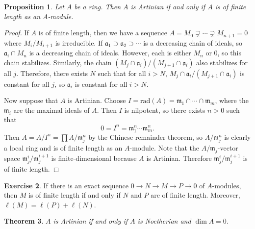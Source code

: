 \documentclass[leqno, openany]{memoir}
\newtheorem{thm}{Theorem}[section]
\newtheorem{prop}[thm]{Proposition}
\theoremstyle{definition}
\newtheorem{exer}[thm]{Exercise}
\theoremstyle{remark}
\theoremstyle{plain}
\theoremstyle{definition}
\theoremstyle{remark}
\newcommand{\mf}[1]{\mathfrak{#1}}
\newcommand{\mr}[1]{\mathrm{#1}}
\begin{document}
\begin{prop} Let $A$ be a ring. Then $A$ is Artinian if and only if $A$ is of
finite length as an $A$-module.  \end{prop}

\begin{proof} If $A$ is of finite length, then we have a sequence $A = M_0
    \supsetneq \cdots \supsetneq M_{n+1} = 0$ where $M_i / M_{i+1}$ is
    irreducible. If $\mf{a}_1 \supset \mf{a}_2 \supset \cdots$ is a decreasing
    chain of ideals, so $\mf{a}_i \cap M_n$ is a decreasing chain of ideals.
    However, each is either $M_n$ or $0$, so this chain stabilizes. Similarly,
    the chain $(M_j \cap \mf{a}_i) / (M_{j+1} \cap \mf{a}_i)$ also stabilizes
    for all $j$. Therefore, there exists $N$ such that for all $i > N$, $M_j
    \cap \mf{a}_i / (M_{j+1} \cap \mf{a}_i)$ is constant for all $j$, so
    $\mf{a}_i$ is constant for all $i > N$.

    Now suppose that $A$ is Artinian. Choose $I = \mr{rad}(A) = \mf{m}_1 \cap
    \cdots \cap \mf{m}_m$, where the $\mf{m}_i$ are the maximal ideals of $A$.
    Then $I$ is nilpotent, so there exists $n > 0$ such that \[ 0 = I^n =
    \mf{m}_1^n \cdots \mf{m}_m^n. \] Then $A = A / I^n = \prod A/ \mf{m}_j^n$
    by the Chinese remainder theorem, so $A / \mf{m}_j^n$ is clearly a local
    ring and is of finite length as an $A$-module. Note that the
    $A/\mf{m}_j$-vector space $\mf{m}_j^i / \mf{m}_j^{i+1}$ is
    finite-dimensional because $A$ is Artinian. Therefore $\mf{m}_j^i /
    \mf{m}_j^{i+1}$ is of finite length.  \end{proof}

\begin{exer} If there is an exact sequence $0 \to N \to M \to P \to 0$ of
$A$-modules, then $M$ is of finite length if and only if $N$ and $P$ are of
finite length. Moreover, $\ell(M) = \ell(P) + \ell(N)$.  \end{exer}

\begin{thm} $A$ is Artinian if and only if $A$ is Noetherian and $\dim A = 0$.
\end{thm}
\end{document}

